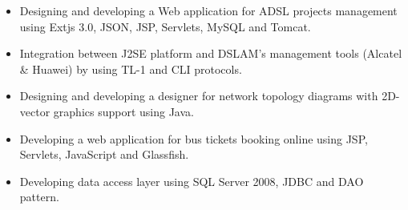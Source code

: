 \documentclass[10pt,a4paper,ragged2e]{altacv}
\begin{document}
\vspace{10px}

\begin{itemize}
   \item Designing and developing a Web application for ADSL projects management using Extjs 3.0, JSON, JSP, Servlets, MySQL and Tomcat.
   \item Integration between J2SE platform and DSLAM's management tools (Alcatel \& Huawei) by using TL-1 and CLI protocols.
   \item Designing and developing a designer for network topology diagrams with 2D-vector graphics support using Java.
\end{itemize}

\vspace{10px}

\begin{itemize}
   \item Developing a web application for bus tickets booking online using JSP, Servlets, JavaScript and Glassfish.
   \item Developing data access layer using SQL Server 2008, JDBC and DAO pattern.
\end{itemize}

\vspace{10px}



\clearpage
\end{document}
